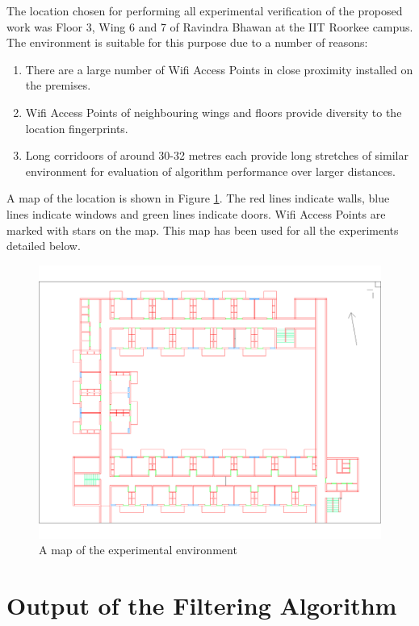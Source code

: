 The location chosen for performing all experimental verification of the
proposed work was Floor 3, Wing 6 and 7 of Ravindra Bhawan at the IIT Roorkee
campus. The environment is suitable for this purpose due to a number of reasons:

\begin{enumerate}
\item There are a large number of Wifi Access Points in close proximity 
    installed on the premises.
\item Wifi Access Points of neighbouring wings and floors provide diversity
    to the location fingerprints.
\item Long corridoors of around 30-32 metres each provide long stretches of
    similar environment for evaluation of algorithm performance over larger
    distances.
\end{enumerate}

A map of the location is shown in Figure \ref{fig:ravindra_map}. The red lines
indicate walls, blue lines indicate windows and green lines indicate doors.
Wifi Access Points are marked with stars on the map. This map has been used
for all the experiments detailed below.

\begin{figure}
    \centering
    \includegraphics[width=5in]{figures/ravindra_map.png}
    \caption{A map of the experimental environment\label{fig:ravindra_map}}
\end{figure}

\section{Output of the Filtering Algorithm}

